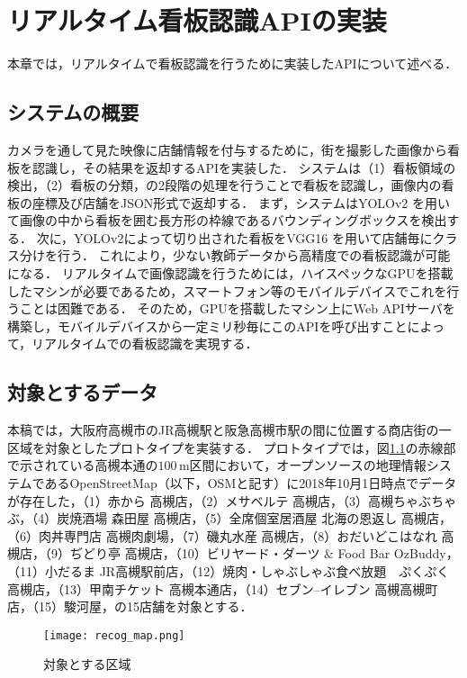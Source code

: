 \chapter{リアルタイム看板認識APIの実装}
\label{chapter:implement_recog}
本章では，リアルタイムで看板認識を行うために実装したAPIについて述べる．

\section{システムの概要}
  カメラを通して見た映像に店舗情報を付与するために，街を撮影した画像から看板を認識し，その結果を返却するAPIを実装した\cite{Kitamura:2018}．
  システムは（1）看板領域の検出，（2）看板の分類，の2段階の処理を行うことで看板を認識し，画像内の看板の座標及び店舗をJSON形式で返却する．
  まず，システムはYOLOv2 \cite{Redmon:2017}を用いて画像の中から看板を囲む長方形の枠線であるバウンディングボックスを検出する．
  次に，YOLOv2によって切り出された看板をVGG16 \cite{Simonyan:2015}を用いて店舗毎にクラス分けを行う．
  これにより，少ない教師データから高精度での看板認識が可能になる．
  リアルタイムで画像認識を行うためには，ハイスペックなGPUを搭載したマシンが必要であるため，スマートフォン等のモバイルデバイスでこれを行うことは困難である．
  そのため，GPUを搭載したマシン上にWeb APIサーバを構築し，モバイルデバイスから一定ミリ秒毎にこのAPIを呼び出すことによって，リアルタイムでの看板認識を実現する．
  
\section{対象とするデータ}
\label{section:target_data}
  本稿では，大阪府高槻市のJR高槻駅と阪急高槻市駅の間に位置する商店街の一区域を対象としたプロトタイプを実装する．
  プロトタイプでは，図\ref{figure:recog_map}の赤線部で示されている高槻本通の$100\, \mathrm{m}$区間において，オープンソースの地理情報システムであるOpenStreetMap（以下，OSMと記す）\cite{Haklay:2008}に2018年10月1日時点でデータが存在した，（1）赤から 高槻店，（2）メサベルテ 高槻店，（3）高槻ちゃぶちゃぶ，（4）炭焼酒場 森田屋 高槻店，（5）全席個室居酒屋 北海の恩返し 高槻店，（6）肉丼専門店 高槻肉劇場，（7）磯丸水産 高槻店，（8）おだいどこはなれ 高槻店，（9）ぢどり亭 高槻店，（10）ビリヤード・ダーツ \& Food Bar OzBuddy，（11）小だるま JR高槻駅前店，（12）焼肉・しゃぶしゃぶ食べ放題　ぷくぷく　高槻店，（13）甲南チケット 高槻本通店，（14）セブン--イレブン 高槻高槻町店，（15）駿河屋，の15店舗を対象とする．
  \begin{figure}[tb]
    \centerline{\texttt{[image: recog\_map.png]}}
    \caption{対象とする区域}
    \label{figure:recog_map}
  \end{figure}

